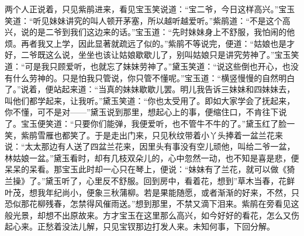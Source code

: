 \begin{parag}
    两个人正说着，只见紫鹃进来，看见宝玉笑说道：“宝二爷，今日这样高兴。”宝玉笑道：“听见妹妹讲究的叫人顿开茅塞，所以越听越爱听。”紫鹃道：“不是这个高兴，说的是二爷到我们这边来的话。”宝玉道：“先时妹妹身上不舒服，我怕闹的他烦。再者我又上学，因此显著就疏远了似的。”紫鹃不等说完，便道：“姑娘也是才好，二爷既这么说，坐坐也该让姑娘歇歇儿了，别叫姑娘只是讲究劳神了。”宝玉笑道：“可是我只顾爱听，也就忘了妹妹劳神了。”黛玉笑道：“说这些倒也开心，也没有什么劳神的。只是怕我只管说，你只管不懂呢。”宝玉道：“横竖慢慢的自然明白了。”说着，便站起来道：“当真的妹妹歇歇儿罢。明儿我告诉三妹妹和四妹妹去，叫他们都学起来，让我听。”黛玉笑道：“你也太受用了。即如大家学会了抚起来，你不懂，可不是对——”黛玉说到那里，想起心上的事，便缩住口，不肯往下说了。宝玉便笑道：“只要你们能弹，我便爱听，也不管牛不牛的了。”黛玉红了脸一笑，紫鹃雪雁也都笑了。于是走出门来，只见秋纹带着小丫头捧着一盆兰花来说：“太太那边有人送了四盆兰花来，因里头有事没有空儿顽他，叫给二爷一盆，林姑娘一盆。”黛玉看时，却有几枝双朵儿的，心中忽然一动，也不知是喜是悲，便呆呆的呆看。那宝玉此时却一心只在琴上，便说：“妹妹有了兰花，就可以做《猗兰操》了。”黛玉听了，心里反不舒服。回到房中，看着花，想到”草木当春，花鲜叶茂，想我年纪尚小，便象三秋蒲柳。若是果能随愿，或者渐渐的好来，不然，只恐似那花柳残春，怎禁得风催雨送。”想到那里，不禁又滴下泪来。紫鹃在旁看见这般光景，却想不出原故来。方才宝玉在这里那么高兴，如今好好的看花，怎么又伤起心来。正愁着没法儿解，只见宝钗那边打发人来。未知何事，下回分解。
\end{parag}